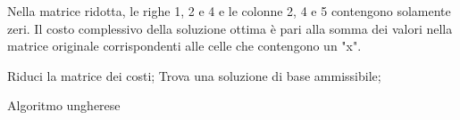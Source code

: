 Nella matrice ridotta, le righe 1, 2 e 4 e le colonne 2, 4 e 5 contengono solamente zeri. Il costo complessivo della soluzione ottima è pari alla somma dei valori nella matrice originale corrispondenti alle celle che contengono un "x".

\begin{algorithm}[H]
\SetAlgoLined
{}
Riduci la matrice dei costi;
Trova una soluzione di base ammissibile;
\caption{Algoritmo ungherese}
\end{algorithm}
